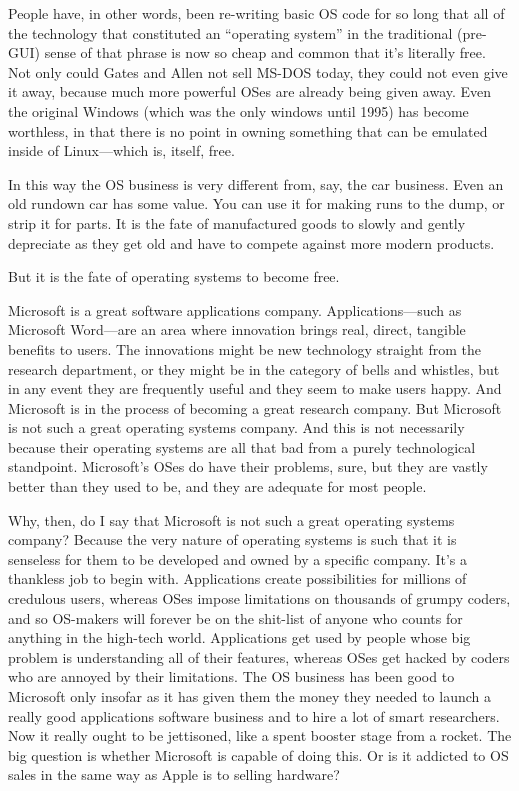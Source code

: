 \documentclass[
  fontsize=11pt,
  paper=landscape,
  twocolumn=true,
  pagesize=pdftex,
  headings=small,
  DIV=15,
  ]{scrartcl}
\begin{document}
People have, in other words, been re-writing basic OS code for so long
that all of the technology that constituted an ``operating system'' in
the traditional (pre-GUI) sense of that phrase is now so cheap and
common that it's literally free. Not only could Gates and Allen not sell
MS-DOS today, they could not even give it away, because much more
powerful OSes are already being given away. Even the original Windows
(which was the only windows until 1995) has become worthless, in that
there is no point in owning something that can be emulated inside of
Linux---which is, itself, free.

In this way the OS business is very different from, say, the car
business. Even an old rundown car has some value. You can use it for
making runs to the dump, or strip it for parts. It is the fate of
manufactured goods to slowly and gently depreciate as they get old and
have to compete against more modern products.

But it is the fate of operating systems to become free.

Microsoft is a great software applications company. Applications---such
as Microsoft Word---are an area where innovation brings real, direct,
tangible benefits to users. The innovations might be new technology
straight from the research department, or they might be in the category
of bells and whistles, but in any event they are frequently useful and
they seem to make users happy. And Microsoft is in the process of
becoming a great research company. But Microsoft is not such a great
operating systems company. And this is not necessarily because their
operating systems are all that bad from a purely technological
standpoint. Microsoft's OSes do have their problems, sure, but they are
vastly better than they used to be, and they are adequate for most
people.

Why, then, do I say that Microsoft is not such a great operating systems
company? Because the very nature of operating systems is such that it is
senseless for them to be developed and owned by a specific company. It's
a thankless job to begin with. Applications create possibilities for
millions of credulous users, whereas OSes impose limitations on
thousands of grumpy coders, and so OS-makers will forever be on the
shit-list of anyone who counts for anything in the high-tech world.
Applications get used by people whose big problem is understanding all
of their features, whereas OSes get hacked by coders who are annoyed by
their limitations. The OS business has been good to Microsoft only
insofar as it has given them the money they needed to launch a really
good applications software business and to hire a lot of smart
researchers. Now it really ought to be jettisoned, like a spent booster
stage from a rocket. The big question is whether Microsoft is capable of
doing this. Or is it addicted to OS sales in the same way as Apple is to
selling hardware?
\end{document}
